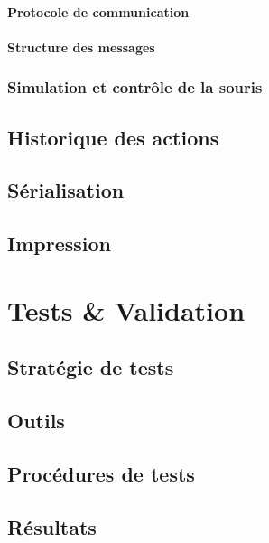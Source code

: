 \documentclass[11pt,a4paper,oldfontcommands]{memoir}
\begin{document}
\subsubsection{Protocole de communication}

\subsubsection{Structure des messages}

\subsection{Simulation et contrôle de la souris}

\section{Historique des actions}

\section{Sérialisation}

\section{Impression}


\chapter{Tests \& Validation}

\section{Stratégie de tests}

\section{Outils}

\section{Procédures de tests}

\section{Résultats}
\end{document}
